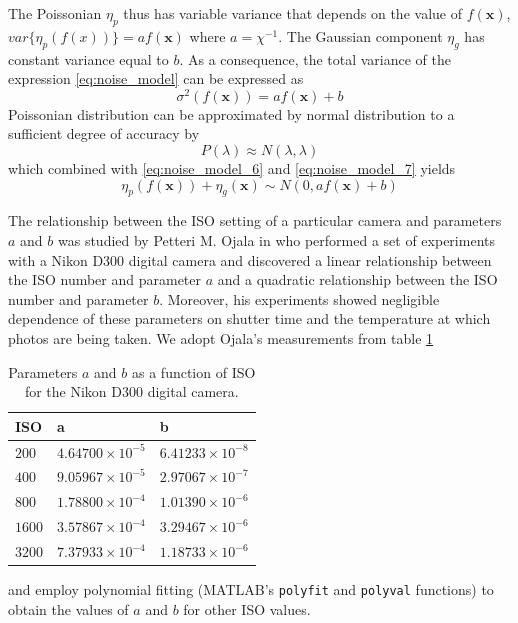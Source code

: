 \documentclass[12pt,notitlepage]{report}
\begin{document}
The Poissonian $\eta_p$ thus has variable variance that depends on the value of $f(\mathbf{x})$, $var\lbrace \eta_p (f(x) ) \rbrace = af(\mathbf{x})$ where $a=\chi^{-1}$. The Gaussian component $\eta_g$ has constant variance equal to $b$. As a consequence, the total variance of the expression \ref{eq:noise_model} can be expressed as
\begin{equation}
\label{eq:noise_model_7}
	\sigma^{2}(f(\mathbf{x})) = a f(\mathbf{x}) + b
\end{equation}
Poissonian distribution can be approximated by normal distribution to a sufficient degree of accuracy by
\begin{equation}
\label{eq:noise_model_8}
	P(\lambda) \approx N(\lambda, \lambda)
\end{equation}
which combined with \ref{eq:noise_model_6} and \ref{eq:noise_model_7} yields 
\begin{equation}
\label{eq:noise_model_9}
	\eta_p(f(\mathbf{x})) +  \eta_g(\mathbf{x}) \sim N(0, a f(\mathbf{x}) + b)
\end{equation}

The relationship between the ISO setting of a particular camera and parameters $a$ and $b$ was studied by Petteri M. Ojala in \cite{ojal08} who performed a set of experiments with a Nikon D300 digital camera and discovered a linear relationship between the ISO number and parameter $a$ and a quadratic relationship between the ISO number and parameter $b$. Moreover, his experiments showed negligible dependence of these parameters on shutter time and the temperature at which photos are being taken. 
We adopt Ojala's measurements from table \ref{tab:ojal}
\begin{table}
  \centering
  \begin{tabular}{ |l | l | l | }
    \hline
	ISO & a & b \\ \hline
    $200$ & $4.64700 \times 10^{-5}$& $6.41233 \times 10^{-8}$ \\ \hline
    $400$ & $9.05967 \times 10^{-5}$ & $2.97067 \times 10^{-7}$ \\ \hline
    $800$ & $1.78800 \times 10^{-4}$ & $1.01390 \times 10^{-6}$ \\ \hline
    $1600$ & $3.57867 \times 10^{-4}$ & $3.29467 \times 10^{-6}$ \\ \hline
    $3200$ & $7.37933 \times 10^{-4}$ & $1.18733 \times 10^{-6}$ \\ 
    \hline
  \end{tabular}
  \caption[Parameters $a$ and $b$ as a function of ISO for the Nikon D300 digital camera]{Parameters $a$ and $b$ as a function of ISO for the Nikon D300 digital camera.}
  \label{tab:ojal}
\end{table}
and employ polynomial fitting (MATLAB's \texttt{polyfit} and \texttt{polyval} functions) to obtain the values of $a$ and $b$ for other ISO values. 
\end{document}
